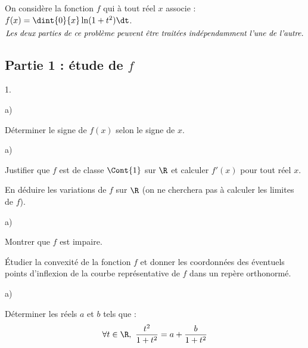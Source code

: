 \noindent
On considère la fonction $f$ qui à tout réel $x$ associe : $f(x) =
\dint{0}{x} \ln(1+ t^2) \dt$.
\[
\mbox{\it Les deux parties de ce problème peuvent être traitées
  indépendamment l'une de l'autre.}
\]

\subsection*{Partie 1 : étude de $f$}

\begin{noliste}{1.}
  \setlength{\itemsep}{4mm}
\item
  \begin{noliste}{a)}
    \setlength{\itemsep}{2mm}
  \item Déterminer le signe de $f(x)$ selon le signe de $x$.
  \end{noliste}
    
  



  
  \begin{noliste}{a)}
    \setlength{\itemsep}{2mm} %
    \setcounter{enumii}{1}
  \item Justifier que $f$ est de classe $\Cont{1}$ sur $\R$ et
    calculer $f'(x)$ pour tout réel $x$.
    
    
    
  \item En déduire les variations de $f$ sur $\R$ (on ne cherchera pas
    à calculer les limites de $f$).

    
  \end{noliste}




\item 
  \begin{noliste}{a)}
    \setlength{\itemsep}{2mm}
  \item Montrer que $f$ est impaire.

    
    
  \item Étudier la convexité de la fonction $f$ et donner les
    coordonnées des éventuels points d'inflexion de la courbe
    représentative de $f$ dans un repère orthonormé.

    
  \end{noliste}




\item 
  \begin{noliste}{a)}
    \setlength{\itemsep}{2mm}
  \item Déterminer les réels $a$ et $b$ tels que :
    \[
    \forall t \in \R, \ \dfrac{t^2}{1 + t^2} = a + \dfrac{b}{1 + t^2}
    \]


\end{noliste}
\end{noliste}

